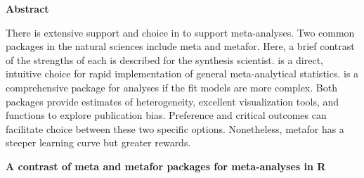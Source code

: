 \documentclass[softwarereview]{jss}
\begin{document}
\textbf{Abstract} \newline

There is extensive support and choice in  to support meta-analyses.  Two common packages in the natural sciences include meta and metafor.  Here, a brief contrast of the strengths of each is described for the synthesis scientist.   is a direct, intuitive choice for rapid implementation of general meta-analytical statistics.   is a comprehensive package for analyses if the fit models are more complex.  Both packages provide estimates of heterogeneity, excellent visualization tools, and functions to explore publication bias.  Preference and critical outcomes can facilitate choice between these two specific options.  Nonetheless, metafor has a steeper learning curve but greater rewards.  \newline

\textbf{A contrast of meta and metafor packages for meta-analyses in R} \newline
\end{document}
